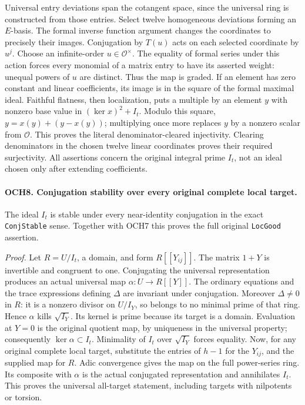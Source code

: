 Universal entry deviations span the cotangent space, since the
universal ring is constructed from those entries.  Select twelve
homogeneous deviations forming an \(E\)-basis.  The formal inverse
function argument changes the coordinates to precisely their images.
Conjugation by \(T(u)\) acts on each selected coordinate by
\(u^j\).  Choose an infinite-order \(u\in\mathcal O^\times\).
The equality of formal series under this action forces every monomial
of a matrix entry to have its asserted weight: unequal powers of
\(u\) are distinct.  Thus the map is graded.
If an element has zero constant and linear coefficients, its image
is in the square of the formal maximal ideal.  Faithful flatness,
then localization, puts a multiple by an element \(y\) with
nonzero base value in \((\ker x)^2+I_t\).  Modulo this square,
\(y=x(y)+(y-x(y))\); multiplying once more replaces \(y\)
by a nonzero scalar from \(\mathcal O\).  This proves the
literal denominator-cleared injectivity.  Clearing denominators in
the chosen twelve linear coordinates proves their required
surjectivity.  All assertions concern the original integral prime
\(I_t\), not an ideal chosen only after extending coefficients.

\paragraph{OCH8. Conjugation stability over every original complete local target.}
\label{claim:OCH8}
The ideal \(I_t\) is stable under every near-identity conjugation
in the exact \texttt{ConjStable} sense.  Together with OCH7 this
proves the full original \texttt{LocGood} assertion.

\emph{Proof.}
Let \(R=U/I_t\), a domain, and form
\(R[[Y_{ij}]]\).  The matrix \(1+Y\) is invertible and
congruent to one.  Conjugating the universal representation produces
an actual universal map
\(\alpha:U\to R[[Y]]\).  The ordinary equations and the
trace expressions defining \(\Delta\) are invariant under
conjugation.  Moreover \(\Delta\ne0\) in \(R\): it is a
nonzero divisor on \(U/I_Y\), so belongs to no minimal prime
of that ring.  Hence \(\alpha\) kills \(\sqrt{I_Y}\).
Its kernel is prime because its target is a domain.  Evaluation at
\(Y=0\) is the original quotient map, by uniqueness in the
universal property; consequently \(\ker\alpha\subset I_t\).
Minimality of \(I_t\) over \(\sqrt{I_Y}\) forces equality.
Now, for any original complete local target, substitute the entries
of \(h-1\) for the \(Y_{ij}\), and the supplied map for
\(R\).  Adic convergence gives the map on the full power-series
ring.  Its composite with \(\alpha\) is the actual conjugated
representation and annihilates \(I_t\).  This proves the universal
all-target statement, including targets with nilpotents or torsion.

